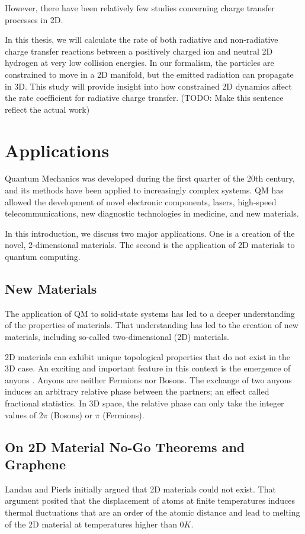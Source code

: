 However, there have been relatively few studies concerning charge transfer processes in 2D.

In this thesis, we will calculate the rate of both radiative 
and non-radiative charge transfer reactions between a positively charged ion and neutral 2D hydrogen at very low collision energies. In our formalism, the particles are constrained to move in a 2D manifold, but the emitted radiation can propagate in 3D. This study will provide insight into how constrained 2D dynamics affect the rate coefficient for radiative charge transfer.
 (TODO: Make this sentence reflect the actual work)

\section{Applications}
Quantum Mechanics was developed during the first quarter of the 20th century, and its methods have been applied to increasingly complex systems. QM has allowed the development of novel electronic components, lasers, high-speed telecommunications, new diagnostic technologies in medicine, and new materials.

 In this introduction, we discuss two major applications.
 One is a creation of the novel, 2-dimensional materials.
 The second is the application of 2D materials to quantum computing.
 
 \subsection{New Materials}

The application of QM to solid-state systems has led to a deeper understanding of the properties of materials. That understanding has led to the creation of new materials, including so-called two-dimensional (2D) materials.
 
2D materials can exhibit unique topological properties that do not exist in the 3D case. An exciting and important feature in this context is the emergence of anyons \cite{anyonsR}. Anyons are neither Fermions nor Bosons. The exchange of two anyons induces an arbitrary relative phase between the partners; an effect called fractional statistics.
In 3D space, the relative phase can only take the integer values of $2 \pi $ (Bosons) or $ \pi$ (Fermions).
 
\subsection{On 2D Material No-Go Theorems and
Graphene}
Landau and Pierls\cite{LandauG}\cite{Pierls} initially argued that 2D materials could not exist. That argument posited that the displacement of atoms at finite temperatures induces thermal fluctuations that are an order of the atomic distance\cite{LandauG, Pierls} and lead to melting of the 2D material at temperatures higher than $ 0 K $. 

